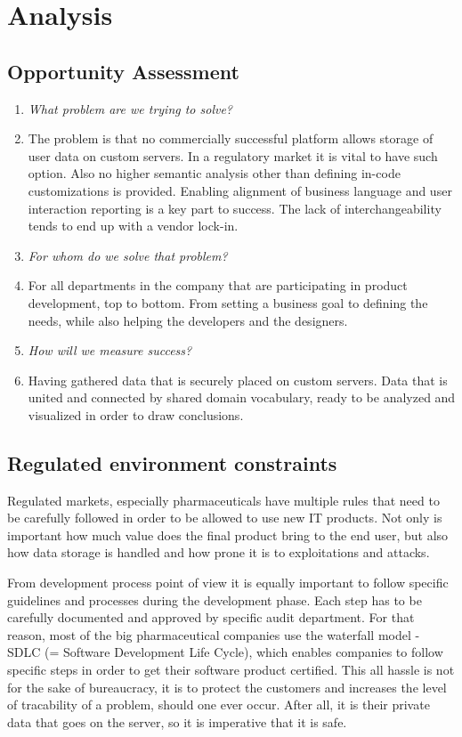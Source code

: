 \chapter{Analysis}

\section{Opportunity Assessment}

\begin{enumerate}
	\item \emph{What problem are we trying to solve?}
	\item[] The problem is that no commercially successful platform allows storage of user data on custom servers. In a regulatory market it is vital to have such option. Also no higher semantic analysis other than defining in-code customizations is provided. Enabling alignment of business language and user interaction reporting is a key part to success. The lack of interchangeability tends to end up with a vendor lock-in.
	
	\item \emph{For whom do we solve that problem?}
	\item[] 	For all departments in the company that are participating in product development, top to bottom. From setting a business goal to defining the needs, while also helping the developers and the designers.
	
	\item \emph{How will we measure success?}
	\item[] Having gathered data that is securely placed on custom servers. Data that is united and connected by shared domain vocabulary, ready to be analyzed and visualized in order to draw conclusions.
\end{enumerate}


\section{Regulated environment constraints}

Regulated markets, especially pharmaceuticals have multiple rules that need to be carefully followed in order to be allowed to use new IT products. Not only is important how much value does the final product bring to the end user, but also how data storage is handled and how prone it is to exploitations and attacks. 

From development process point of view it is equally important to follow specific guidelines and processes during the development phase. Each step has to be carefully documented and approved by specific audit department. For that reason, most of the big pharmaceutical companies use the waterfall model - SDLC (= Software Development Life Cycle), which enables companies to follow specific steps in order to get their software product certified. This all hassle is not for the sake of bureaucracy, it is to protect the customers and increases the level of tracability of a problem, should one ever occur. After all, it is their private data that goes on the server, so it is imperative that it is safe.


